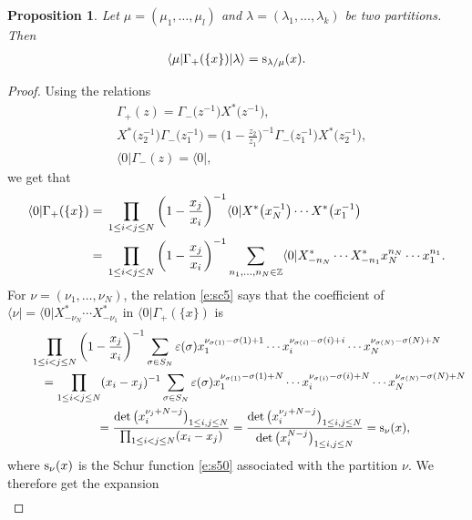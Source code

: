 \documentclass[pdftex]{sigma}
\numberwithin{equation}{section}
\newtheorem{Proposition}[Theorem]{Proposition}
 { \theoremstyle{definition}
\newtheorem{Definition}[Theorem]{Definition}
\newtheorem{Note}[Theorem]{Note}
\newtheorem{Example}[Theorem]{Example}
\newtheorem{Remark}[Theorem]{Remark} }
\begin{document}
\begin{Proposition}\label{pro10}Let $\mu=(\mu_1, \dots,\mu_l)$ and $\lambda=(\lambda_1, \dots,\lambda_k)$ be two partitions. Then
\begin{align}\label{e:sc6}
\langle\mu|\Gamma_+(\{x\})|\lambda\rangle={\rm s}_{\lambda/\mu}(x).
\end{align}
\end{Proposition}
\begin{proof}
Using the relations
\begin{align*}
&\Gamma_+(z)=\Gamma_-\big(z^{-1}\big)X^*\big(z^{-1}\big),\\
&X^*\big(z_2^{-1}\big)\Gamma_-\big(z^{-1}_1\big)=\bigg(1-\frac{z_2}{z_1}\bigg)^{-1}\Gamma_-\big(z^{-1}_1\big)X^*\big(z_2^{-1}\big),\\
&\langle0|\Gamma_-(z)=\langle0|,
\end{align*}
we get that
\begin{align*}%
\notag\langle0|\Gamma_+(\{x\})={}&\prod_{1\leq i< j\leq N}\bigg(1-\frac{x_j}{x_i}\bigg)^{-1}\langle0|X^*\big(x_N^{-1}\big)\cdots X^*\big(x_1^{-1}\big)\\
={}&\prod_{1\leq i< j\leq N}\bigg(1-\frac{x_j}{x_i}\bigg)^{-1}\sum_{n_1,\dots,n_N\in\mathbb{Z}}\langle0|X^*_{-n_N}\cdots X^*_{-n_1}x^{n_N}_N\cdots x^{n_1}_1.
\end{align*}
For %
$\nu=(\nu_1,\dots,\nu_N)$, the relation \eqref{e:sc5} says that the coefficient of $\langle\nu|=\langle 0|X^*_{-\nu_N}\cdots X^*_{-\nu_1}$ in $\langle0|\Gamma_+(\{x\})$
 is
\begin{gather*}
\prod_{1\leq i<j\leq N}\bigg(1-\frac{x_j}{x_i}\bigg)^{-1}\sum_{\sigma\in S_N}\varepsilon(\sigma)x^{\nu_{\sigma(1)}-\sigma(1)+1}_1\cdots x^{\nu_{\sigma(i)}-\sigma(i)+i}_i\cdots x^{\nu_{\sigma(N)}-\sigma(N)+N}_N\\
 \quad\qquad= \prod_{1\leq i<j\leq N} (x_i-x_j)^{-1}\sum_{\sigma\in S_N}\varepsilon(\sigma)x^{\nu_{\sigma(1)}-\sigma(1)+N}_1\cdots x^{\nu_{\sigma(i)}-\sigma(i)+N}_i\cdots x^{\nu_{\sigma(N)}-\sigma(N)+N}_N\\
 \quad\qquad= \frac{\det\big(x^{\nu_j+N-j}_i\big)_{1\leq i,j\leq N}}{\prod_{1\leq i<j\leq N} (x_i-x_j)}=\frac{\det\big(x^{\nu_j+N-j}_i\big)_{1\leq i,j\leq N}}{\det\big(x^{N-j}_i\big)_{1\leq i,j\leq N}}={\rm s}_\nu(x),
\end{gather*}
where ${\rm s}_\nu(x)$ is the Schur function \eqref{e:s50} associated with the partition $\nu$. We therefore get the expansion
\begin{align}\label{e:sc8}

\end{align}
\end{proof}
\end{document}
